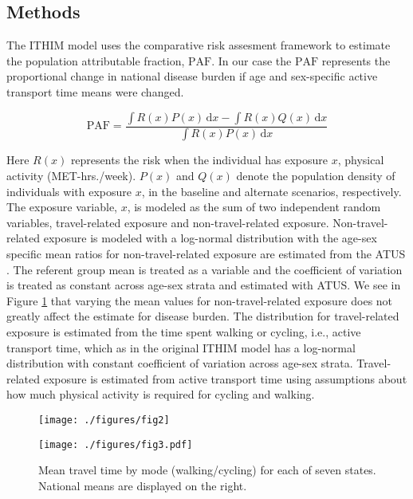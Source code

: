 \documentclass{bioinfo}
\newcommand{\af}{\mathrm{PAF}}
\newcommand{\mets}{MET-hrs./week}
\newcommand{\logNormal}{log-normal}
\begin{document}
\begin{methods}

\section{Methods}

The ITHIM model uses the comparative risk assesment framework to
estimate the population attributable fraction, $\af$.  In our case the
$\af$ represents the proportional change in national disease burden if
age and sex-specific active transport time means were changed.

\begin{equation}
\af = \frac{\int \! R(x)P(x) \, \mathrm{d}x  - \int \! R(x)Q(x) \, \mathrm{d}x}{\int \! R(x)P(x) \, \mathrm{d}x}
\end{equation}

Here $R(x)$ represents the risk when the individual has exposure $x$,
physical activity (\mets).  $P(x)$ and $Q(x)$ denote the population
density of individuals with exposure $x$, in the baseline and
alternate scenarios, respectively.  The exposure variable, $x$, is
modeled as the sum of two independent random variables, travel-related
exposure and non-travel-related exposure.  Non-travel-related exposure
is modeled with a \logNormal{} distribution with the age-sex specific
mean ratios for non-travel-related exposure are estimated from the
ATUS \cite{ATUS}.  The referent group mean is treated as a variable
and the coefficient of variation is treated as constant across age-sex
strata and estimated with ATUS.  We see in Figure \ref{dalyFigure}
that varying the mean values for non-travel-related exposure does not
greatly affect the estimate for disease burden.  The distribution for
travel-related exposure is estimated from the time spent walking or
cycling, i.e., active transport time, which as in the original ITHIM
model has a \logNormal{} distribution with constant coefficient of
variation across age-sex strata.  Travel-related exposure is estimated
from active transport time using assumptions about how much physical
activity is required for cycling and walking.

\end{methods}

\begin{figure}[t]
    \centerline{\texttt{[image: ./figures/fig2]}}
    \caption{}\label{dalyFigure}
\end{figure}

\begin{figure}[t]
  \centerline{\texttt{[image: ./figures/fig3.pdf]}}
    \caption{Mean travel time by mode (walking/cycling) for each of
      seven states.  National means are displayed on the
      right.}\label{meanMatrices}
\end{figure}
\end{document}
